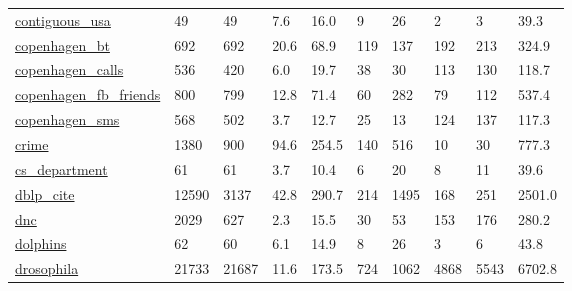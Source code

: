 \begin{longtable}{llllllllll}
 \href{http://konect.cc/networks/contiguous-usa}{contiguous\_usa}                                                            & 49         & 49    & 7.6    & 16.0   & 9     & 26     & 2      & 3      & 39.3    \\
 \href{https://doi.org/10.6084/m9.figshare.7267433}{copenhagen\_bt}                                                          & 692        & 692   & 20.6   & 68.9   & 119   & 137    & 192    & 213    & 324.9   \\
 \href{https://doi.org/10.6084/m9.figshare.7267433}{copenhagen\_calls}                                                       & 536        & 420   & 6.0    & 19.7   & 38    & 30     & 113    & 130    & 118.7   \\
 \href{https://doi.org/10.6084/m9.figshare.7267433}{copenhagen\_fb\_friends}                                                  & 800        & 799   & 12.8   & 71.4   & 60    & 282    & 79     & 112    & 537.4   \\
 \href{https://doi.org/10.6084/m9.figshare.7267433}{copenhagen\_sms}                                                         & 568        & 502   & 3.7    & 12.7   & 25    & 13     & 124    & 137    & 117.3   \\
 \href{http://konect.cc/networks/moreno_crime}{crime}                                                                       & 1380       & 900   & 94.6   & 254.5  & 140   & 516    & 10     & 30     & 777.3   \\
 \href{https://manliodedomenico.com/data.php}{cs\_department}                                                                & 61         & 61    & 3.7    & 10.4   & 6     & 20     & 8      & 11     & 39.6    \\
 \href{http://konect.cc/networks/dblp-cite}{dblp\_cite}                                                                      & 12590      & 3137  & 42.8   & 290.7  & 214   & 1495   & 168    & 251    & 2501.0  \\
 \href{http://konect.cc/networks/dnc-corecipient}{dnc}                                                                      & 2029       & 627   & 2.3    & 15.5   & 30    & 53     & 153    & 176    & 280.2   \\
 \href{http://www-personal.umich.edu/~mejn/netdata/}{dolphins}                                                              & 62         & 60    & 6.1    & 14.9   & 8     & 26     & 3      & 6      & 43.8    \\
 \href{https://doi.org/10.7554/eLife.57443}{drosophila}                                                                     & 21733      & 21687 & 11.6   & 173.5  & 724   & 1062   & 4868   & 5543   & 6702.8  \\

\end{longtable}
